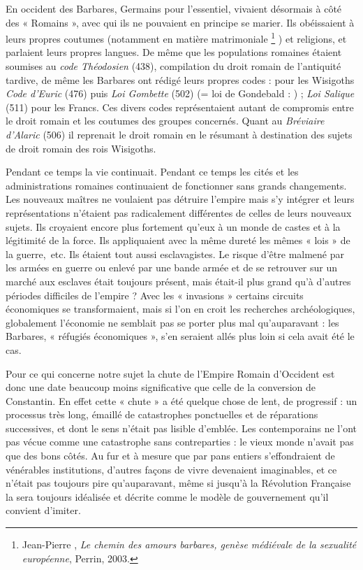  En occident des Barbares, Germains pour l'essentiel, vivaient désormais à côté des « Romains », avec qui ils ne pouvaient en principe se marier. Ils obéissaient à leurs propres coutumes (notamment en matière matrimoniale%
\footnote{Jean-Pierre , \emph{Le chemin des amours barbares, genèse médiévale de la sexualité européenne}, Perrin, 2003.}%
) et religions, et parlaient leurs propres langues. De même que les populations romaines étaient soumises au \emph{code Théodosien} (438), compilation du droit romain de l'antiquité tardive, de même les Barbares ont rédigé leurs propres codes : pour les Wisigoths \emph{Code d'Euric} (476) puis \emph{Loi Gombette} (502) (= loi de Gondebald : ) ; \emph{Loi Salique} (511) pour les Francs. Ces divers codes représentaient autant de compromis entre le droit romain et les coutumes des groupes concernés. Quant au \emph{Bréviaire d'Alaric} (506) il reprenait le droit romain en le résumant à destination des sujets de droit romain des rois Wisigoths.

 Pendant ce temps la vie continuait. Pendant ce temps les cités et les administrations romaines continuaient de fonctionner sans grands changements. Les nouveaux maîtres ne voulaient pas détruire l'empire mais s'y intégrer et leurs représentations n'étaient pas radicalement différentes de celles de leurs nouveaux sujets. Ils croyaient encore plus fortement qu'eux à un monde de castes et à la légitimité de la force. Ils appliquaient avec la même dureté les mêmes « lois » de la guerre,~etc. Ils étaient tout aussi esclavagistes. Le risque d'être malmené par les armées en guerre ou enlevé par une bande armée et de se retrouver sur un marché aux esclaves était toujours présent, mais était-il plus grand qu'à d'autres périodes difficiles de l'empire ? Avec les « invasions » certains circuits économiques se transformaient, mais si l'on en croit les recherches archéologiques, globalement l'économie ne semblait pas se porter plus mal qu'auparavant : les Barbares, « réfugiés économiques », s'en seraient allés plus loin si cela avait été le cas.

 Pour ce qui concerne notre sujet la chute de l'Empire Romain d'Occident est donc une date beaucoup moins significative que celle de la conversion de Constantin. En effet cette « chute » a été quelque chose de lent, de progressif : un processus très long, émaillé de catastrophes ponctuelles et de réparations successives, et dont le sens n'était pas lisible d'emblée. Les contemporains ne l'ont pas vécue comme une catastrophe sans contreparties : le vieux monde n'avait pas que des bons côtés. Au fur et à mesure que par pans entiers s'effondraient de vénérables institutions, d'autres façons de vivre devenaient imaginables, et ce n'était pas toujours pire qu'auparavant, même si jusqu'à la Révolution Française la  sera toujours idéalisée et décrite comme le modèle de gouvernement qu'il convient d'imiter. 

